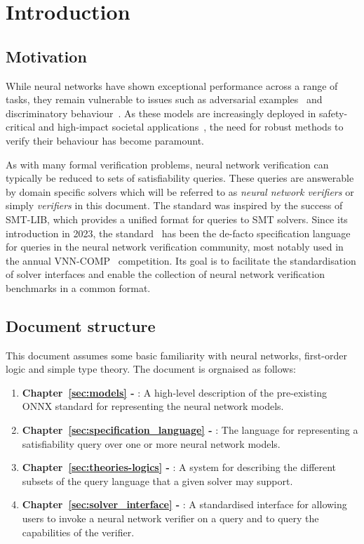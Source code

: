 \chapter{Introduction}
\label{sec:intro}

\section{Motivation}


While neural networks have shown exceptional performance across a range of tasks, 
they remain vulnerable to issues such as adversarial examples~\cite{szegedy2013intriguing} and discriminatory behaviour~\cite{4}. As these models are increasingly deployed in safety-critical and high-impact societal applications~\cite{1,2,3}, the need for robust methods to verify their behaviour has become paramount.

As with many formal verification problems, neural network verification can typically be reduced to sets of satisfiability queries. These queries are answerable by domain specific solvers which will be referred to as \emph{neural network verifiers} or simply \emph{verifiers} in this document. The \vnnlib{} standard was inspired by the success of SMT-LIB, which provides a unified format for queries to SMT solvers. 
Since its introduction in 2023, the \vnnlib{} standard~\cite{5} has been the de-facto specification language for queries in the neural network verification community, most notably used in the annual VNN-COMP~\cite{7} competition. Its goal is to facilitate the standardisation of solver interfaces and enable the collection of neural network verification benchmarks in a common format. 

\section{Document structure}

This document assumes some basic familiarity with neural networks, first-order logic and simple type theory. The document is orgnaised as follows:
\begin{enumerate}
\item \textbf{Chapter~\ref{sec:models} - }: A high-level description of the pre-existing ONNX standard for representing the neural network models.
\item \textbf{Chapter~\ref{sec:specification_language} - }: The \vnnlib{} language for representing a satisfiability query over one or more neural network models.
\item \textbf{Chapter~\ref{sec:theories-logics} - }: A system for describing the different subsets of the query language that a given solver may support.
\item \textbf{Chapter~\ref{sec:solver_interface} - }: A standardised interface for allowing users to invoke a neural network verifier on a query and to query the capabilities of the verifier.
\end{enumerate}

